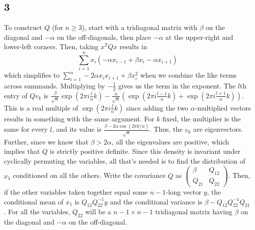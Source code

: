 \documentclass{article}
\newcommand{\openm}{\begin{pmatrix}}
\newcommand{\closem}{\end{pmatrix}}
\begin{document}
\subsection*{3}
\vspace{130pt}
To construct $Q$ (for $n\geq3$), start with a tridiagonal matrix with $\beta$ on the diagonal and $-\alpha$ on the off-diagonals, then place $-\alpha$ at the upper-right and lower-left corners. Then, taking $x^TQx$ results in 
\[\sum_{i=1}^nx_i(-\alpha x_{i-1}+\beta x_i-\alpha x_{i+1})\]
which simplifies to $\sum_{i=1}^n-2\alpha x_ix_{i+1}+\beta x_i^2$ when we combine the like terms across summands. Multiplying by $-\frac{1}{2}$ gives us the term in the exponent.
The $l$th entry of $Qv_k$ is $\frac{\beta}{\sqrt{n}}\exp(2\pi i\frac{l}{n}k)-\frac{\alpha}{\sqrt{n}}\left(\exp(2\pi i\frac{l-1}{n}k)+\exp(2\pi i\frac{l+1}{n}k)\right)$. This is a real multiple of $\exp(2\pi i\frac{l}{n}k)$ since adding the two $\alpha$-multiplied vectors results in something with the same argument. For $k$ fixed, the multiplier is the same for every $l$, and its value is $\frac{\beta-2\alpha\cos(2\pi k/n)}{\sqrt{n}}$. Thus, the $v_k$ are eigenvectors. Further, since we know that $\beta>2\alpha$, all the eigenvalues are positive, which implies that $Q$ is strictly positive definite.
Since this density is invariant under cyclically permuting the variables, all that's needed is to find the distribution of $x_1$ conditioned on all the others. Write the covariance $Q$ as $\openm \beta&Q_{12}\\Q_{21}&Q_{22}\closem$. Then, if the other variables taken together equal some $n-1$-long vector $y$, the conditional mean of $x_1$ is $Q_{12}Q_{22}^{-1}y$ and the conditional variance is $\beta-Q_{12}Q_{22}^{-1}Q_{21}$. For all the variables, $Q_{22}$ will be a $n-1\times n-1$ tridiagonal matrix having $\beta$ on the diagonal and $-\alpha$ on the off-diagonal.
\end{document}
